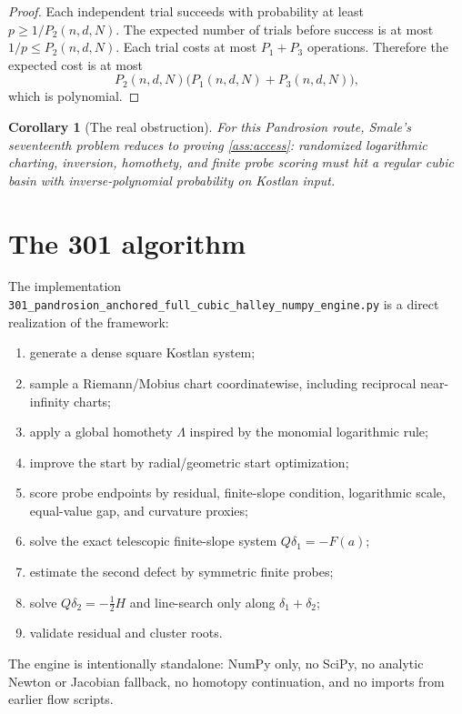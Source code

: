 \documentclass[11pt]{article}
\newtheorem{corollary}[definition]{Corollary}
\begin{document}
\begin{proof}
Each independent trial succeeds with probability at least $p\ge 1/P_2(n,d,N)$.  The expected number of trials before success is at most $1/p\le P_2(n,d,N)$.  Each trial costs at most $P_1+P_3$ operations.  Therefore the expected cost is at most
\[
        P_2(n,d,N)\bigl(P_1(n,d,N)+P_3(n,d,N)\bigr),
\]
which is polynomial.
\end{proof}

\begin{corollary}[The real obstruction]
For this Pandrosion route, Smale's seventeenth problem reduces to proving \cref{ass:access}: randomized logarithmic charting, inversion, homothety, and finite probe scoring must hit a regular cubic basin with inverse-polynomial probability on Kostlan input.
\end{corollary}

\section{The 301 algorithm}

The implementation \texttt{301\_pandrosion\_anchored\_full\_cubic\_halley\_numpy\_engine.py} is a direct realization of the framework:
\begin{enumerate}[label=(\roman*)]
\item generate a dense square Kostlan system;
\item sample a Riemann/Mobius chart coordinatewise, including reciprocal near-infinity charts;
\item apply a global homothety $\Lambda$ inspired by the monomial logarithmic rule;
\item improve the start by radial/geometric start optimization;
\item score probe endpoints by residual, finite-slope condition, logarithmic scale, equal-value gap, and curvature proxies;
\item solve the exact telescopic finite-slope system $Q\delta_1=-F(a)$;
\item estimate the second defect by symmetric finite probes;
\item solve $Q\delta_2=-\frac12H$ and line-search only along $\delta_1+\delta_2$;
\item validate residual and cluster roots.
\end{enumerate}
The engine is intentionally standalone: NumPy only, no SciPy, no analytic Newton or Jacobian fallback, no homotopy continuation, and no imports from earlier flow scripts.
\end{document}
